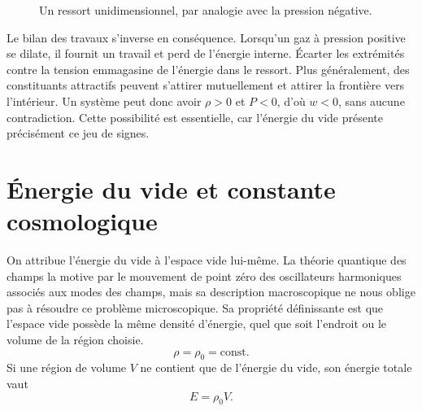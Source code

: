 \begin{figure}[htbp]
\centering
{}
\caption{Un ressort unidimensionnel, par analogie avec la pression négative.}
\label{fig:c05-tension}
\end{figure}

Le bilan des travaux s’inverse en conséquence. Lorsqu’un gaz à pression positive se dilate, il fournit un travail et perd de l’énergie interne. Écarter les extrémités contre la tension emmagasine de l’énergie dans le ressort. Plus généralement, des constituants attractifs peuvent s’attirer mutuellement et attirer la frontière vers l’intérieur. Un système peut donc avoir \(\rho>0\) et \(P<0\), d’où \(w<0\), sans aucune contradiction. Cette possibilité est essentielle, car l’énergie du vide présente précisément ce jeu de signes.

\section{Énergie du vide et constante cosmologique}

On attribue l’énergie du vide à l’espace vide lui-même. La théorie quantique des champs la motive par le mouvement de point zéro des oscillateurs harmoniques associés aux modes des champs, mais sa description macroscopique ne nous oblige pas à résoudre ce problème microscopique. Sa propriété définissante est que l’espace vide possède la même densité d’énergie, quel que soit l’endroit ou le volume de la région choisie.
\begin{equation}
\rho=\rho_0=\text{const.}
\label{eq:c05-vacuum-density}
\end{equation}
Si une région de volume \(V\) ne contient que de l’énergie du vide, son énergie totale vaut
\begin{equation}
E=\rho_0 V.
\end{equation}
\begin{classroomqa}
\end{classroomqa}


